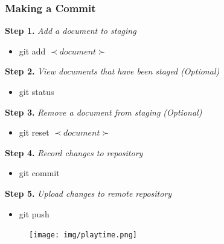 \documentclass{beamer}
\begin{document}
\begin{frame}
	\frametitle{\textbf{Making a Commit}}

	\textbf{Step 1.} \textit{Add a document to staging}
	\begin{itemize}
		\item git add \(\prec document \succ\)
	\end{itemize}

	
	\vspace{0.5cm}

	\textbf{Step 2.} \textit{View documents that have been staged (Optional)}
	\begin{itemize}
		\item git status
	\end{itemize}

	
	\vspace{0.5cm}

	\textbf{Step 3.} \textit{Remove a document from staging (Optional)}
	\begin{itemize}
		\item git reset \(\prec document \succ\)
	\end{itemize}


	\vspace{0.5cm}

	\textbf{Step 4.} \textit{Record changes to repository}
	\begin{itemize}
		\item git commit
	\end{itemize}


	\vspace{0.5cm}

	\textbf{Step 5.} \textit{Upload changes to remote repository}
	\begin{itemize}
		\item git push 
	\end{itemize}
\end{frame}

\begin{frame}
	\begin{figure}[h]
	\centering
	\texttt{[image: img/playtime.png]} 
	\end{figure}
\end{frame}
\end{document}

